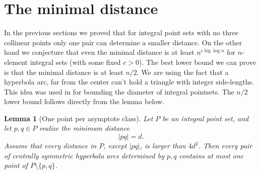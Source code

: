 \documentclass[11pt]{article}
\newtheorem{lemma}[theorem]{Lemma}
\begin{document}
\section{The minimal distance}

In the previous sections we proved that for integral point sets with no three collinear points only one pair can determine a smaller distance.
On the other hand we conjecture that even the minimal distance is at least $n^{c\log{\log{n}}}$ for $n$-element integral sets (with some fixed $c>0$).
The best lower bound we can prove is that the minimal distance is at least $n/2$. We are using the fact that a hyperbola arc, far from the center 
can't hold a triangle with integer side-lengths. This idea was used in \cite{Soly1} for bounding the diameter of integral pointsets. The $n/2$ lower bound 
follows directly from the lemma below.

\begin{lemma}[One point per asymptote class]
Let \(P\) be an integral point set, and let \(p,q\in P\) realize the minimum
distance
\[
        |pq|=d.
\]
Assume that every distance in \(P\), except \(|pq|\), is larger than \(4d^2\).
Then every pair of centrally symmetric hyperbola arcs determined by \(p,q\)
contains at most one point of \(P\setminus\{p,q\}\).
\end{lemma}
\end{document}
